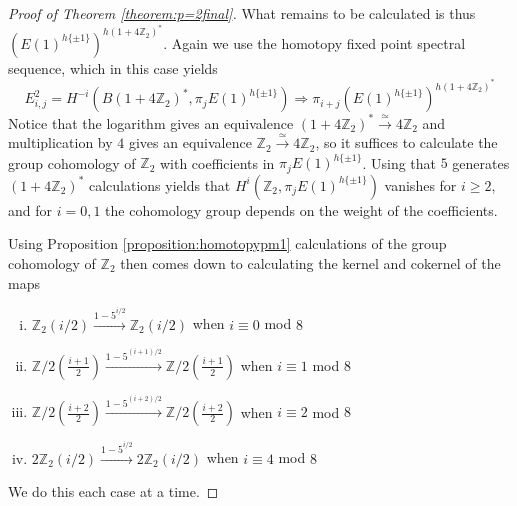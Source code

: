 \documentclass[a4paper]{article} %
\theoremstyle{definition}
\newcommand{\toWithMapLong}[1]{\overset{#1}{\longrightarrow}}
\newcommand{\Z}{\mathbb{Z}}
\renewcommand{\implies}{\Rightarrow}    %
\begin{document}
\begin{proof}[Proof of Theorem \ref{theorem:p=2final}]
  What remains to be calculated is thus $\left(E(1)^{h\{\pm 1\}}\right)^{h(1 + 4\Z_2)^*}$. Again we use the homotopy fixed point spectral sequence, which in this case yields
  \[
  E^2_{i,j} = H^{-i}(B(1+4 \Z_2)^*, \pi_jE(1)^{h\{\pm 1\}}) \implies \pi_{i+j}\left(E(1)^{h\{\pm 1\}}\right)^{h(1 + 4\Z_2)^*}
  \]
  Notice that the logarithm gives an equivalence $(1+4\Z_2)^*\toWithMapLong{\simeq} 4\Z_2$ and multiplication by $4$ gives an equivalence $\Z_2 \toWithMapLong{\simeq} 4\Z_2$, so it suffices to calculate the group cohomology of $\Z_2$ with coefficients in $\pi_jE(1)^{h\{\pm 1\}}$. Using that $5$ generates $(1+4\Z_2)^*$ calculations yields that
  $H^i(\Z_2, \pi_jE(1)^{h\{\pm 1\}})$ vanishes for $i \ge 2$, and for $i =0,1$ the cohomology group depends on the weight of the coefficients.
  \iffalse
  \begin{center}
    \begin{tikzpicture}
    \matrix (m) [matrix of math nodes,
      nodes in empty cells,nodes={minimum width=5ex,
      minimum height=5ex,outer sep=0pt},
      column sep=1ex,row sep=1ex]{
        \cdots & &      &     &     & \\
           \cdots &    &  \Z &  0  & \Z & \\
           \cdots  &   &  \Z  & \Z &  \Z_2(0 )  & \\
      \strut\cdots  &   -2  &  -1  & 0 & \strut \\};
  \draw[thick] (m-1-6.west) -- (m-4-6.west) ;
  \draw[thick] (m-4-1.north) -- (m-4-6.north) ;
  \end{tikzpicture}
  \end{center}
  \fi
   Using Proposition \ref{proposition:homotopypm1} calculations of the group cohomology of $\Z_2$ then comes down to calculating the kernel and cokernel of the maps
  \begin{enumerate}[i)]
    \item $\Z_2(i/2) \toWithMapLong{1-5^{i/2}} \Z_2(i/2)$ when $i \equiv 0$ mod $8$
    \item $\Z/2(\frac{i+1}{2}) \toWithMapLong{1-5^{(i+1)/2}} \Z/2(\frac{i+1}{2})$ when $i \equiv 1$ mod $8$
    \item $\Z/2(\frac{i+2}{2}) \toWithMapLong{1-5^{(i+2)/2}} \Z/2(\frac{i+2}{2})$ when $i \equiv 2$ mod $8$
    \item $2\Z_2(i/2) \toWithMapLong{1-5^{i/2}} 2\Z_2(i/2)$ when $i \equiv 4$ mod $8$
  \end{enumerate}
  We do this each case at a time.

\end{proof}
\end{document}
